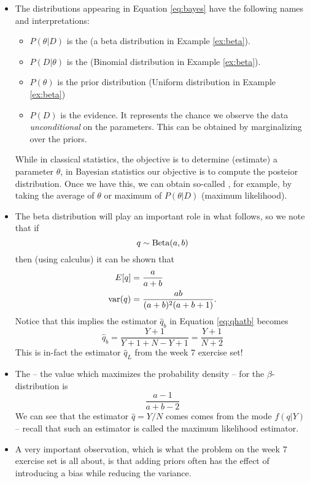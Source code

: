 \begin{itemize}
\item The distributions appearing in Equation \eqref{eq:bayes} have the following names and interpretations:
\begin{itemize}
\item $P(\theta|D)$ is the  (a beta distribution in Example \ref{ex:beta}).
\item $P(D|\theta)$ is the  (Binomial distribution in Example \ref{ex:beta}).
\item $P(\theta)$ is the prior distribution (Uniform distribution in Example \ref{ex:beta})
\item $P(D)$ is the evidence. It represents the chance we observe the data \emph{unconditional} on the parameters. This can be obtained by marginalizing over the priors.
\end{itemize}
While in classical statistics, the objective is to determine (estimate) a parameter $\theta$, in Bayesian statistics our objective is to compute the posteior distribution. Once we have this, we can obtain so-called , for example, by taking the average of $\theta$ or maximum of $P(\theta|D)$ (maximum likelihood). 
\item The beta distribution will play an important role in what follows, so we note that if 
\begin{equation*}
q \sim {\rm Beta}(a,b)
\end{equation*}
then (using calculus) it can be shown that 
\begin{align*}
E[q] &= \frac{a}{a+b}\\
{\rm var}(q) &= \frac{ab}{(a+b)^2(a+b+1)}.
\end{align*}
Notice that this implies the estimator $\hat{q}_b$ in Equation \ref{eq:qhatb} becomes 
\begin{equation*}
\hat{q}_b = \frac{Y+1}{Y+1+N-Y+1} = \frac{Y+1}{N+2}
\end{equation*}
This is in-fact the estimator $\hat{q}_L$ from the week 7 exercise set!

\item The  -- the value which maximizes the probability density -- for the $\beta$-distribution is 
\begin{equation*}
\frac{a-1}{a+b-2}
\end{equation*}
 We can see that  the estimator $\hat{q} = Y/N$ comes comes from the mode $f(q|Y)$ -- recall that such an estimator is called the maximum likelihood estimator.  

\item A very important observation, which is what the problem on the week 7 exercise set is all about, is that adding priors often has the effect of introducing a bias while reducing the variance. 


\end{itemize}
